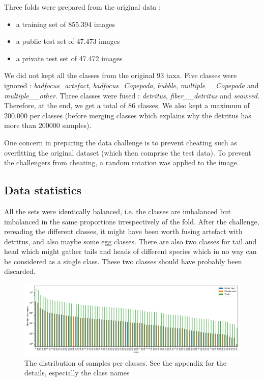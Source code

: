 \documentclass{article}
\begin{document}
Three folds were prepared from the original data :
\begin{itemize}
	\item a training set of 855.394 images
	\item a public test set of 47.473 images
	\item a private test set of 47.472 images
\end{itemize}

We did not kept all the classes from the original 93 taxa. Five classes were ignored : \emph{badfocus\_artefact}, \emph{badfocus\_Copepoda}, \emph{bubble}, \emph{multiple\_\_Copepoda} and \emph{multiple\_\_other}. Three classes were fused : \emph{detritus}, \emph{fiber\_\_detritus} and \emph{seaweed}. Therefore, at the end, we get a total of $86$ classes. We also kept a maximum of $200.000$ per classes (before merging classes which explains why the detritus has more than $200000$ samples).

One concern in preparing the data challenge is to prevent cheating such as overfitting the original dataset (which then comprise the test data). To prevent the challengers from cheating, a random rotation was applied to the image.


\subsection{Data statistics}

All the sets were identically balanced, i.e. the classes are imbalanced but imbalanced in the same proportions irrespectively of the fold. After the challenge, rereading the different classes, it might have been worth fusing artefact with detritus, and also maybe some egg classes. There are also two classes for tail and head which might gather tails and heads of different species which in no way can be considered as a single class. These two classes should have probably been discarded.

\begin{figure}
	\includegraphics[width=\columnwidth]{figs/stats.pdf}
	\caption{\label{fig:classdistrib} The distribution of samples per classes. See the appendix for the details, especially the class names}
\end{figure}
\end{document}
